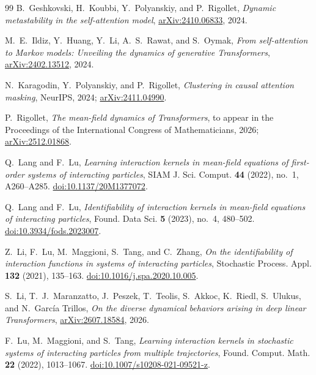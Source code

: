 \documentclass[11pt]{amsart}
\numberwithin{equation}{section}
\theoremstyle{plain}
\begin{document}
\begin{thebibliography}{99}
B.~Geshkovski, H.~Koubbi, Y.~Polyanskiy, and P.~Rigollet,
\emph{Dynamic metastability in the self-attention model},
\href{https://arxiv.org/abs/2410.06833}{arXiv:2410.06833}, 2024.

M.~E.~Ildiz, Y.~Huang, Y.~Li, A.~S.~Rawat, and S.~Oymak,
\emph{From self-attention to Markov models: Unveiling the dynamics of
generative Transformers},
\href{https://arxiv.org/abs/2402.13512}{arXiv:2402.13512}, 2024.

N.~Karagodin, Y.~Polyanskiy, and P.~Rigollet,
\emph{Clustering in causal attention masking},
NeurIPS, 2024;
\href{https://arxiv.org/abs/2411.04990}{arXiv:2411.04990}.

P.~Rigollet,
\emph{The mean-field dynamics of Transformers},
to appear in the Proceedings of the International Congress of Mathematicians,
2026;
\href{https://arxiv.org/abs/2512.01868}{arXiv:2512.01868}.

Q.~Lang and F.~Lu,
\emph{Learning interaction kernels in mean-field equations of first-order
systems of interacting particles},
SIAM J. Sci. Comput. \textbf{44} (2022), no.~1, A260--A285.
\href{https://doi.org/10.1137/20M1377072}{doi:10.1137/20M1377072}.

Q.~Lang and F.~Lu,
\emph{Identifiability of interaction kernels in mean-field equations of
interacting particles},
Found. Data Sci. \textbf{5} (2023), no.~4, 480--502.
\href{https://doi.org/10.3934/fods.2023007}{doi:10.3934/fods.2023007}.

Z.~Li, F.~Lu, M.~Maggioni, S.~Tang, and C.~Zhang,
\emph{On the identifiability of interaction functions in systems of
interacting particles},
Stochastic Process. Appl. \textbf{132} (2021), 135--163.
\href{https://doi.org/10.1016/j.spa.2020.10.005}
{doi:10.1016/j.spa.2020.10.005}.

S.~Li, T.~J.~Maranzatto, J.~Peszek, T.~Teolis, S.~Akkoc, K.~Riedl,
S.~Ulukus, and N.~Garc\'ia Trillos,
\emph{On the diverse dynamical behaviors arising in deep linear Transformers},
\href{https://arxiv.org/abs/2607.18584}{arXiv:2607.18584}, 2026.

F.~Lu, M.~Maggioni, and S.~Tang,
\emph{Learning interaction kernels in stochastic systems of interacting
particles from multiple trajectories},
Found. Comput. Math. \textbf{22} (2022), 1013--1067.
\href{https://doi.org/10.1007/s10208-021-09521-z}
{doi:10.1007/s10208-021-09521-z}.


\end{thebibliography}
\end{document}
